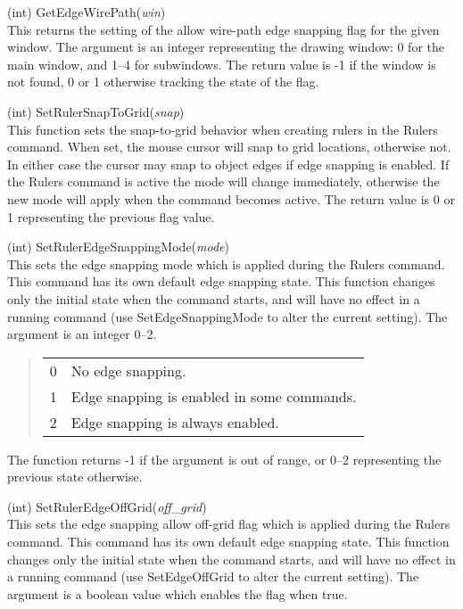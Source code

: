 \begin{description}
\item{(int) \vt GetEdgeWirePath({\it win})}\\
This returns the setting of the allow wire-path edge snapping flag for
the given window.  The argument is an integer representing the drawing
window:  0 for the main window, and 1--4 for subwindows.  The return
value is -1 if the window is not found, 0 or 1 otherwise tracking the
state of the flag.

\item{(int) \vt SetRulerSnapToGrid({\it snap})}\\
This function sets the snap-to-grid behavior when creating rulers in
the {\cb Rulers} command.  When set, the mouse cursor will snap to
grid locations, otherwise not.  In either case the cursor may snap to
object edges if edge snapping is enabled.  If the {\cb Rulers} command
is active the mode will change immediately, otherwise the new mode
will apply when the command becomes active.  The return value is 0 or
1 representing the previous flag value.

\item{(int) \vt SetRulerEdgeSnappingMode({\it mode})}\\
This sets the edge snapping mode which is applied during the {\cb
Rulers} command.  This command has its own default edge snapping
state.  This function changes only the initial state when the command
starts, and will have no effect in a running command (use {\vt
SetEdgeSnappingMode} to alter the current setting).  The argument is
an integer 0--2.

\begin{quote}
\begin{tabular}{ll}
0 & No edge snapping.\\
1 & Edge snapping is enabled in some commands.\\
2 & Edge snapping is always enabled.\\
\end{tabular}
\end{quote}

The function returns -1 if the argument is out of range, or 0--2
representing the previous state otherwise.

\item{(int) \vt SetRulerEdgeOffGrid({\it off\_grid})}\\
This sets the edge snapping allow off-grid flag which is applied
during the {\cb Rulers} command.  This command has its own default
edge snapping state.  This function changes only the initial state
when the command starts, and will have no effect in a running command
(use {\vt SetEdgeOffGrid} to alter the current setting).  The argument
is a boolean value which enables the flag when true.


\end{description}
